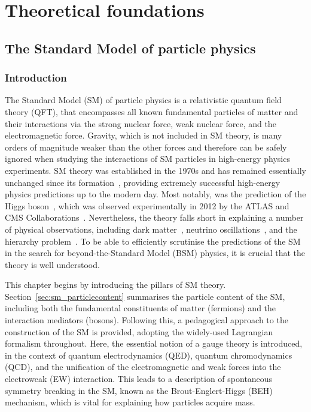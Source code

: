 \chapter{Theoretical foundations}
\label{chap:theory}

\section{The Standard Model of particle physics}
\subsection{Introduction}

The Standard Model (SM) of particle physics is a relativistic quantum field theory (QFT), that encompasses all known fundamental particles of matter and their interactions via the strong nuclear force, weak nuclear force, and the electromagnetic force. Gravity, which is not included in SM theory, is many orders of magnitude weaker than the other forces and therefore can be safely ignored when studying the interactions of SM particles in high-energy physics experiments. SM theory was established in the 1970s and has remained essentially unchanged since its formation~\cite{Glashow:1961tr,Weinberg:1967tq,Salam:1968rm}, providing extremely successful high-energy physics predictions up to the modern day. Most notably, was the prediction of the Higgs boson~\cite{Englert:1964et,HIGGS1964132,Higgs:1964pj,Guralnik:1964eu,PhysRev.145.1156,PhysRev.155.1554}, which was observed experimentally in 2012 by the ATLAS and CMS Collaborations~\cite{Aad:2012tfa,Chatrchyan:2012xdj,Chatrchyan:2013lba}. Nevertheless, the theory falls short in explaining a number of physical observations, including dark matter~\cite{Aghanim:2018eyx}, neutrino oscillations~\cite{Fukuda:1998mi}, and the hierarchy problem~\cite{PhysRevD.13.974,PhysRevD.20.2619}. To be able to efficiently scrutinise the predictions of the SM in the search for beyond-the-Standard Model (BSM) physics, it is crucial that the theory is well understood.

This chapter begins by introducing the pillars of SM theory. Section~\ref{sec:sm_particlecontent} summarises the particle content of the SM, including both the fundamental constituents of matter (fermions) and the interaction mediators (bosons). Following this, a pedagogical approach to the construction of the SM is provided, adopting the widely-used Lagrangian formalism throughout. Here, the essential notion of a gauge theory is introduced, in the context of quantum electrodynamics (QED), quantum chromodynamics (QCD), and the unification of the electromagnetic and weak forces into the electroweak (EW) interaction. This leads to a description of spontaneous symmetry breaking in the SM, known as the Brout-Englert-Higgs (BEH) mechanism, which is vital for explaining how particles acquire mass. 

